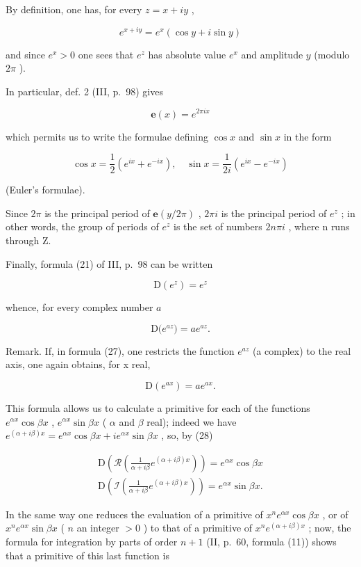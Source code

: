 By definition, one has, for every \(z = x + iy\) ,

\[
e ^ {x + i y} = e ^ {x} (\cos y + i \sin y)\tag{23}
\]

and since \(e^x > 0\) one sees that \(e^z\) has absolute value \(e^x\) and amplitude \(y\) (modulo \(2\pi\) ).

In particular, def. 2 (III, p.~98) gives

\[
\mathbf {e} (x) = e ^ {2 \pi i x}\tag{24}
\]

which permits us to write the formulae defining \(\cos x\) and \(\sin x\) in the form

\[
\cos x = \frac {1}{2} \left(e ^ {i x} + e ^ {- i x}\right), \quad \sin x = \frac {1}{2 i} \left(e ^ {i x} - e ^ {- i x}\right)\tag{25}
\]

(Euler's formulae).

Since \(2\pi\) is the principal period of \(\mathbf{e}(y/2\pi)\) , \(2\pi i\) is the principal period of \(e^{z}\) ; in other words, the group of periods of \(e^{z}\) is the set of numbers \(2n\pi i\) , where n runs through Z.

Finally, formula (21) of III, p.~98 can be written

\[
\mathrm{D} \left(e ^ {z}\right) = e ^ {z}\tag{26}
\]

whence, for every complex number \(a\)

\[
\mathrm{D} \big (e ^ {a z} \big) = a e ^ {a z}.\tag{27}
\]

Remark. If, in formula (27), one restricts the function \(e^{az}\) (a complex) to the real axis, one again obtains, for x real,

\[
\mathrm{D} (e ^ {a x}) = a e ^ {a x}.\tag{28}
\]

This formula allows us to calculate a primitive for each of the functions \(e^{\alpha x} \cos \beta x\) , \(e^{\alpha x} \sin \beta x\) ( \(\alpha\) and \(\beta\) real); indeed we have \(e^{(\alpha + i\beta)x} = e^{\alpha x} \cos \beta x + ie^{\alpha x} \sin \beta x\) , so, by (28)

\[
\begin{array}{l} \mathrm{D} \left(\mathcal {R} \left(\frac {1}{\alpha + i \beta} e ^ {(\alpha + i \beta) x}\right)\right) = e ^ {\alpha x} \cos \beta x \\ \mathrm{D} \left(\mathcal {I} \left(\frac {1}{\alpha + i \beta} e ^ {(\alpha + i \beta) x}\right)\right) = e ^ {\alpha x} \sin \beta x. \end{array}
\]

In the same way one reduces the evaluation of a primitive of \(x^n e^{\alpha x} \cos \beta x\) , or of \(x^n e^{\alpha x} \sin \beta x\) ( \(n\) an integer \(> 0\) ) to that of a primitive of \(x^n e^{(\alpha + i\beta)x}\) ; now, the formula for integration by parts of order \(n + 1\) (II, p.~60, formula (11)) shows that a primitive of this last function is

